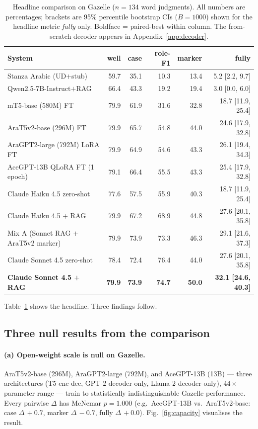 \documentclass[10pt,a4paper,twocolumn]{article}
\begin{document}
\begin{table}[t]
\centering\footnotesize
\caption{Headline comparison on Gazelle ($n{=}134$ word judgments). All numbers are percentages; brackets are 95\% percentile bootstrap CIs ($B{=}1000$) shown for the headline metric \emph{fully} only. Boldface = paired-best within column. The from-scratch decoder appears in Appendix~\ref{app:decoder}.}
\label{tab:headline}
\setlength{\tabcolsep}{6pt}
\begin{tabular}{lrrrrr}
\toprule
\textbf{System} & \textbf{well} & \textbf{case} & \textbf{role-F1} & \textbf{marker} & \textbf{fully} \\
\midrule
Stanza Arabic (UD$+$stub) & 59.7 & 35.1 & 10.3 & 13.4 & 5.2 [2.2, 9.7] \\
Qwen2.5-7B-Instruct$+$RAG & 66.4 & 43.3 & 19.2 & 19.4 & 3.0 [0.0, 6.0] \\
mT5-base (580M) FT & 79.9 & 61.9 & 31.6 & 32.8 & 18.7 [11.9, 25.4] \\
AraT5v2-base (296M) FT & 79.9 & 65.7 & 54.8 & 44.0 & 24.6 [17.9, 32.8] \\
AraGPT2-large (792M) LoRA FT & 79.9 & 64.9 & 54.6 & 43.3 & 26.1 [19.4, 34.3] \\
AceGPT-13B QLoRA FT (1 epoch) & 79.1 & 66.4 & 55.5 & 43.3 & 25.4 [17.9, 32.8] \\
Claude Haiku 4.5 zero-shot & 77.6 & 57.5 & 55.9 & 40.3 & 18.7 [11.9, 25.4] \\
Claude Haiku 4.5 $+$ RAG & 79.9 & 67.2 & 68.9 & 44.8 & 27.6 [20.1, 35.8] \\
Mix A (Sonnet RAG $+$ AraT5v2 marker) & 79.9 & 73.9 & 73.3 & 46.3 & 29.1 [21.6, 37.3] \\
Claude Sonnet 4.5 zero-shot & 78.4 & 72.4 & 76.4 & 44.0 & 27.6 [20.1, 35.8] \\
\textbf{Claude Sonnet 4.5 $+$ RAG} & \textbf{79.9} & \textbf{73.9} & \textbf{74.7} & \textbf{50.0} & \textbf{32.1 [24.6, 40.3]} \\
\bottomrule
\end{tabular}
\end{table}

Table~\ref{tab:headline} shows the headline. Three findings follow.

\subsection{Three null results from the comparison}
\label{sec:nulls}

\paragraph{(a) Open-weight scale is null on Gazelle.}
AraT5v2-base (296M), AraGPT2-large (792M), and AceGPT-13B (13B) --- three architectures (T5 enc-dec, GPT-2 decoder-only, Llama-2 decoder-only), $44\times$ parameter range --- train to statistically indistinguishable Gazelle performance. Every pairwise $\Delta$ has McNemar $p{=}1.000$ (e.g.\ AceGPT-13B vs.\ AraT5v2-base: case $\Delta\,{+}0.7$, marker $\Delta\,{-}0.7$, fully $\Delta\,{+}0.0$). Fig.~\ref{fig:capacity} visualises the result.
\end{document}
